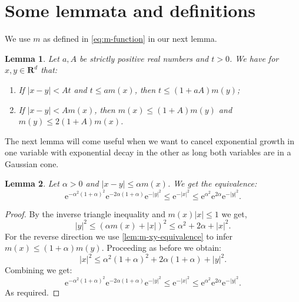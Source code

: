 \documentclass[a4paper,oneside,10pt]{amsproc}
\theoremstyle{plain}
\newtheorem{lemma}{Lemma}
\theoremstyle{remark}
\renewcommand{\leq}{\leqslant}
\renewcommand{\leq}{\leqslant}
\newcommand{\R}{\mathbf R}
\newcommand{\e}{\mathrm{e}} %
\renewcommand{\leq}{\leqslant}%
\begin{document}
\section{Some lemmata and definitions}
We use $m$ as defined in \eqref{eq:m-function} in our next lemma.
\begin{lemma}\label{lem:m-xy-equivalence}
  Let $a, A$ be strictly positive real numbers and $t > 0$. We have
  for $x, y \in \R^d$ that:
  \begin{enumerate}
  \item If $|x - y| < A t$ and $t \leq a m(x)$, then $t
    \leq (1 + aA) m(y)$;
  \item If $|x - y| < A m(x)$, then $m(x) \leq (1 +
    A) m(y)$ and $m(y) \leq 2 (1 + A) m(x)$. 
  \end{enumerate}
\end{lemma}

The next lemma will come useful when we want to cancel exponential
growth in one variable with exponential decay in the other as long
both variables are in a Gaussian cone.
\begin{lemma}\label{lem:Cone-Gaussians-comparable}
  Let $\alpha > 0$ and $|x - y| \leq \alpha m(x)$. We get the
  equivalence:
  \begin{equation*}
    \e^{-\alpha^2(1 + \alpha)^2} \e^{-2\alpha(1 + \alpha)} \e^{-|y|^2}
    \leq \e^{-|x|^2} \leq \e^{\alpha^2} \e^{2\alpha} \e^{-|y|^2}.
  \end{equation*}
\end{lemma}
\begin{proof}
  By the inverse triangle inequality and $m(x)|x| \leq 1$ we get, 
  \begin{equation}
    |y|^2 \leq (\alpha m(x) + |x|)^2 \leq \alpha^2 + 2 \alpha + |x|^2.
  \end{equation}
  For the reverse direction we use
  \autoref{lem:m-xy-equivalence} to infer $m(x) \leq (1 + \alpha)
  m(y)$. Proceeding as before we obtain: 
  \begin{equation*}
    |x|^2 \leq \alpha^2 (1 + \alpha)^2 + 2 \alpha (1 + \alpha) + |y|^2.
  \end{equation*}
  Combining we get:
  \begin{equation}
   \label{eq:Cone-Gaussians-comparable}
    \e^{-\alpha^2(1 + \alpha)^2} \e^{-2\alpha(1 + \alpha)} \e^{-|y|^2}
    \leq \e^{-|x|^2} \leq \e^{\alpha^2} \e^{2\alpha} \e^{-|y|^2}.
  \end{equation}
  As required.
\end{proof}
\end{document}
